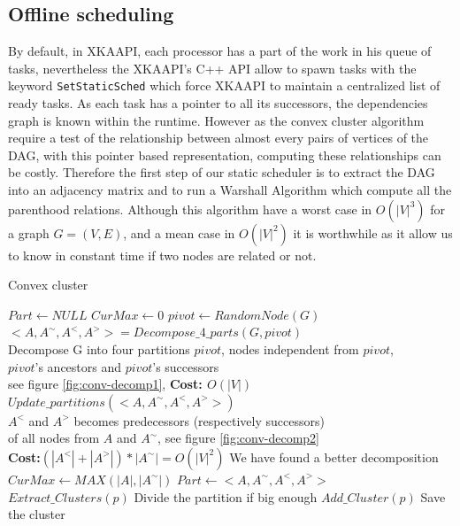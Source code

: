 \documentclass[10pt, conference, compsocconf,pdftex,dvipsnames]{IEEEtran}
\begin{document}
\subsection{Offline scheduling}
\label{sec:impl-off}
By default, in XKAAPI, each processor has a part of the work in his queue of
tasks, nevertheless the XKAAPI's C++ API allow to spawn tasks with the keyword
\texttt{SetStaticSched} which force XKAAPI to maintain a centralized list of
ready tasks. As each task has a pointer to all its successors, the
dependencies graph is known within the runtime. However as the convex cluster
algorithm require a test of the relationship between almost every pairs of
vertices of the DAG,  with this pointer based representation, computing these
relationships can be costly. Therefore the first step of our static scheduler
is to extract the DAG into an adjacency matrix and to run a Warshall Algorithm
which compute all the parenthood relations. Although this algorithm have a
worst case in $O(|V|^3)$ for a graph $G=(V,E)$, and a mean case in $O(|V|^2)$
it is worthwhile as it allow us to know in constant time if two nodes are
related or not.

\begin{algorithm}[h!]
    \centering
    \caption{Convex cluster}
    \label{algo:conv-clust}
    \begin{algorithmic}[1]
        \State $Part \gets NULL$
        \State $CurMax \gets 0$
        \label{algop:main-loop}
        \State $pivot \gets RandomNode(G)$
        \State
        $<A,A^{\sim},A^<,A^>>=Decompose\_4\_parts(G,pivot)$\\\label{algop:init-part}
        \Comment Decompose G into four partitions $pivot$, nodes independent from $pivot$,\\ 
        \Comment $pivot$'s ancestors and $pivot$'s successors\\
        \Comment see figure \ref{fig:conv-decomp1}, \textbf{Cost: $O(|V|)$}
        \State $Update\_partitions(<A,A^{\sim},A^<,A^>>)$
        \\\label{algop:update-part}
        \Comment $A^<$ and $A^>$ becomes predecessors  (respectively successors)\\
        \Comment of all nodes from $A$ and $A^{\sim}$, see figure \ref{fig:conv-decomp2} \\
        \Comment \textbf{Cost:$(|A^<| +
        |A^>| )*|A^{\sim}| = O(|V|^2)$}
         \label{algop:part-choice}
        \Comment We have found a better decomposition
        \State $CurMax \gets MAX(|A|,|A^{\sim}|)$
        \State $Part \gets <A,A^{\sim},A^<,A^>>$
        \EndIf
        \EndFor
        \label{algop:rec-stop}
        \State $Extract\_Clusters(p)$
        \Comment Divide the partition if big enough
        \Else
        \State $Add\_Cluster(p)$
        \Comment Save the cluster
        \EndIf
        \EndFor
        \EndFunction
    \end{algorithmic}
\end{algorithm}
\end{document}
